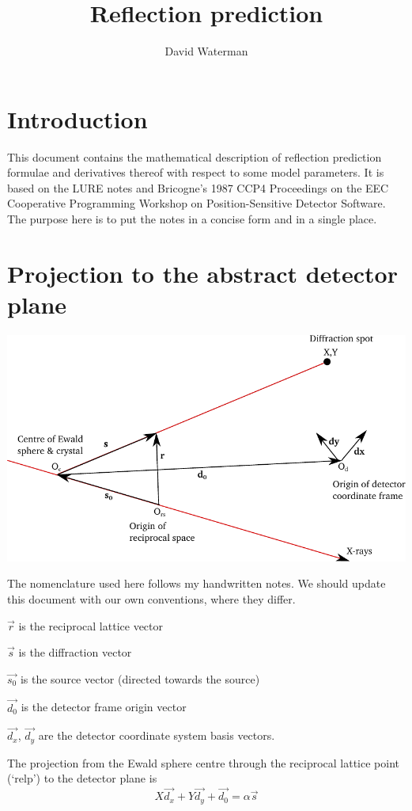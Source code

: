 \documentclass{article}
\title{Reflection prediction}
\author{David Waterman}
\date{}
\begin{document}
\maketitle

\section*{Introduction}
This document contains the mathematical description of reflection prediction formulae and derivatives thereof with respect to some model parameters.
It is based on the LURE notes and Bricogne's 1987 CCP4 Proceedings on the EEC Cooperative Programming Workshop on Position-Sensitive
Detector Software. The purpose here is to put the notes in a concise form and in a single place.

\section*{Projection to the abstract detector plane}
\begin{center}
\includegraphics{diffraction_geometry}
\end{center}
The nomenclature used here follows my handwritten notes. We should update this document with our own conventions, where they differ.

$\vec{r}$ is the reciprocal lattice vector

$\vec{s} $ is the diffraction vector

$\vec{s_0}$ is the source vector (directed towards the source)

$\vec{d_0}$ is the detector frame origin vector

$\vec{d_x}$, $\vec{d_y}$ are the detector coordinate system basis vectors.


The projection from the Ewald sphere centre through the reciprocal lattice point (`relp') to the detector plane is
%
\begin{equation}
X \vec{d_x} + Y \vec{d_y} + \vec{d_0} = \alpha \vec{s}
\end{equation}
\end{document}
